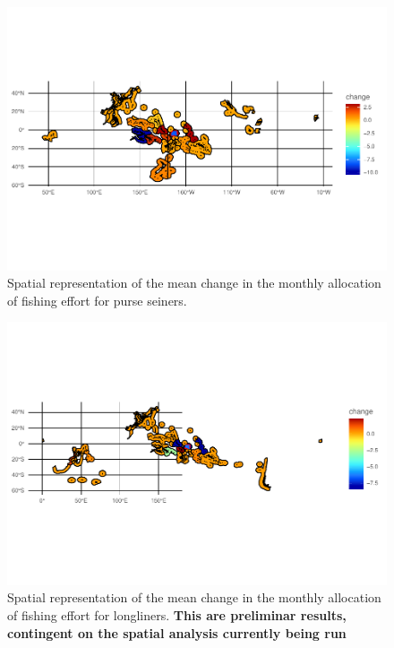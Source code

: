 \documentclass[12pt,]{article}
\begin{document}
\begin{figure}
\centering
\includegraphics{Manuscript_files/figure-latex/unnamed-chunk-17-1.pdf}
\caption{\label{fig:unnamed-chunk-17}\label{fig:map_change_ps}Spatial
representation of the mean change in the monthly allocation of fishing
effort for purse seiners.}
\end{figure}

\begin{figure}
\centering
\includegraphics{Manuscript_files/figure-latex/unnamed-chunk-18-1.pdf}
\caption{\label{fig:unnamed-chunk-18}\label{fig:map_change_ps}Spatial
representation of the mean change in the monthly allocation of fishing
effort for longliners. \textbf{This are preliminar results, contingent
on the spatial analysis currently being run}}
\end{figure}
\end{document}
